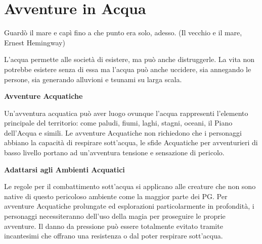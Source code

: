 \section{Avventure in Acqua}

\label{avventure-in-acqua}
\begin{changemargin}{0.3cm}{0.3cm}\begin{enfasi}{
Guardò il mare e capì fino a che punto era solo, adesso. (Il vecchio e il mare, Ernest Hemingway)}\end{enfasi}\end{changemargin}\medskip

\begin{multicols}{2}

L'acqua permette alle società di esistere, ma può anche distruggerle. La vita non potrebbe esistere senza di essa ma l'acqua può anche uccidere, sia annegando le persone, sia generando alluvioni e tsunami su larga scala.

\textbf{Avventure Acquatiche}

Un'avventura acquatica può aver luogo ovunque l'acqua rappresenti l'elemento principale del territorio: come paludi, fiumi, laghi, stagni, oceani, il Piano dell'Acqua e simili. Le avventure Acquatiche non richiedono che i personaggi abbiano la capacità di respirare sott'acqua, le sfide Acquatiche per avventurieri di basso livello portano ad un'avventura tensione e sensazione di pericolo.

\textbf{Adattarsi agli Ambienti Acquatici}

Le regole per il combattimento sott'acqua si applicano alle creature che non sono native di questo pericoloso ambiente come la maggior parte dei PG. Per avventure Acquatiche prolungate ed esplorazioni particolarmente in profondità, i personaggi necessiteranno dell'uso della magia per proseguire le proprie avventure. Il danno da pressione può essere totalmente evitato tramite incantesimi che offrano una resistenza o dal poter respirare sott'acqua.

\medskip

\begin{center}



\end{center}
\end{multicols}
